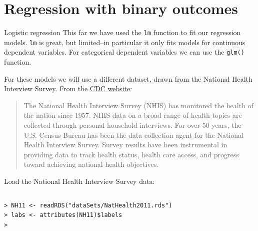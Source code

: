 \documentclass[table,smaller]{beamer}
\begin{document}
\section{Regression with binary outcomes}
\label{sec-4}

\begin{frame}[fragile,label=sec-4-1]{Logistic regression}
 This far we have used the \texttt{lm} function to fit our regression models. \texttt{lm} is great, but limited--in particular it only fits models for continuous dependent variables. For categorical dependent variables we can use the \texttt{glm()} function.

For these models we will use a different dataset, drawn from the National Health Interview Survey. From the \href{http:www.cdc.gov/nchs/nhis.htm}{CDC website}:

\begin{quote}
The National Health Interview Survey (NHIS) has monitored the health of the nation since 1957. NHIS data on a broad range of health topics are collected through personal household interviews. For over 50 years, the U.S. Census Bureau has been the data collection agent for the National Health Interview Survey. Survey results have been instrumental in providing data to track health status, health care access, and progress toward achieving national health objectives.
\end{quote}

Load the National Health Interview Survey data:

\vspace{-.5em}
\begin{columns}
\begin{block}{}
\begin{verbatim}
> NH11 <- readRDS("dataSets/NatHealth2011.rds")
> labs <- attributes(NH11)$labels
>
\end{verbatim}
\end{block}
\end{columns}
\vspace{.5em}
\end{frame}
\end{document}
